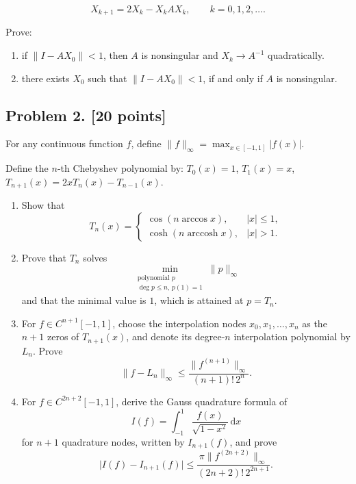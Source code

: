 \documentclass[11pt,a4paper]{article}
\begin{document}
\[
X_{k+1} = 2X_{k} - X_{k} A X_{k}, \qquad k = 0, 1, 2, \dots.
\]

Prove:
\begin{enumerate}[label=(\alph*)]
    \item if \(\|I - A X_{0}\| < 1\), then \(A\) is nonsingular and \(X_{k} \to A^{-1}\) quadratically.
    \item there exists \(X_{0}\) such that \(\|I - A X_{0}\| < 1\), if and only if \(A\) is nonsingular.
\end{enumerate}



\subsection{Problem 2. [20 points]}
For any continuous function \(f\), define \(\|f\|_{\infty} = \max_{x \in [-1,1]} |f(x)|\).

Define the \(n\)-th Chebyshev polynomial by: \(T_{0}(x) = 1\), \(T_{1}(x) = x\), \(T_{n+1}(x) = 2x T_{n}(x) - T_{n-1}(x)\).
\begin{enumerate}[label=(\alph*)]
    \item Show that
    \[
    T_{n}(x) =
    \begin{cases}
    \cos(n \arccos x), & |x| \le 1, \\
    \cosh(n \operatorname{arccosh} x), & |x| > 1.
    \end{cases}
    \]
    \item Prove that \(T_{n}\) solves
    \[
    \min_{\substack{\text{polynomial }p\\ \deg p\le n,\, p(1)=1}}\|p\|_{\infty}
    \]
    and that the minimal value is \(1\), which is attained at \(p = T_{n}\).
    \item For \(f \in C^{n+1}[-1,1]\), choose the interpolation nodes \(x_{0}, x_{1}, \ldots, x_{n}\) as the \(n+1\) zeros of \(T_{n+1}(x)\), and denote its degree-\(n\) interpolation polynomial by \(L_{n}\). Prove
    \[
    \|f - L_{n}\|_{\infty} \le \frac{\|f^{(n+1)}\|_{\infty}}{(n+1)!\, 2^{n}}.
    \]
    \item For \(f \in C^{2n+2}[-1,1]\), derive the Gauss quadrature formula of
    \[
    I(f) = \int_{-1}^{1} \frac{f(x)}{\sqrt{1-x^{2}}}\,\mathrm{d}x
    \]
    for \(n+1\) quadrature nodes, written by \(I_{n+1}(f)\), and prove
    \[
    \bigl|I(f) - I_{n+1}(f)\bigr| \le \frac{\pi \|f^{(2n+2)}\|_{\infty}}{(2n+2)!\, 2^{2n+1}}.
    \]
\end{enumerate}
\end{document}
